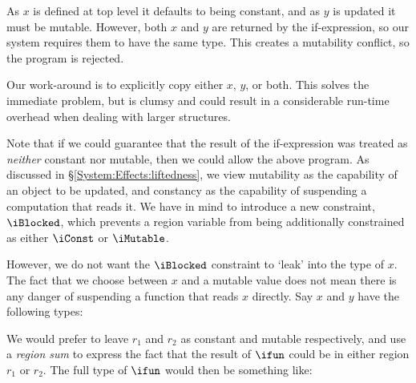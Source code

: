 
As $x$ is defined at top level it defaults to being constant, and as $y$ is updated it must be mutable. However, both $x$ and $y$ are returned by the if-expression, so our system requires them to have the same type. This creates a mutability conflict, so the program is rejected.

Our work-around is to explicitly copy either $x$, $y$, or both. This solves the immediate problem, but is clumsy and could result in a considerable run-time overhead when dealing with larger structures.

Note that if we could guarantee that the result of the if-expression was treated as \emph{neither} constant nor mutable, then we could allow the above program. As discussed in \S\ref{System:Effects:liftedness}, we view mutability as the capability of an object to be updated, and constancy as the capability of suspending a computation that reads it.  We have in mind to introduce a new constraint, $\iBlocked$, which prevents a region variable from being additionally constrained as either $\iConst$ or $\iMutable$.

However, we do not want the $\iBlocked$ constraint to `leak' into the type of $x$. The fact that we choose between $x$ and a mutable value does not mean there is any danger of suspending a function that reads $x$ directly. Say $x$ and $y$ have the following types:


We would prefer to leave $r_1$ and $r_2$ as constant and mutable respectively, and use a \emph{region sum} to express the fact that the result of $\ifun$ could be in either region $r_1$ or $r_2$. The full type of $\ifun$ would then be something like:


